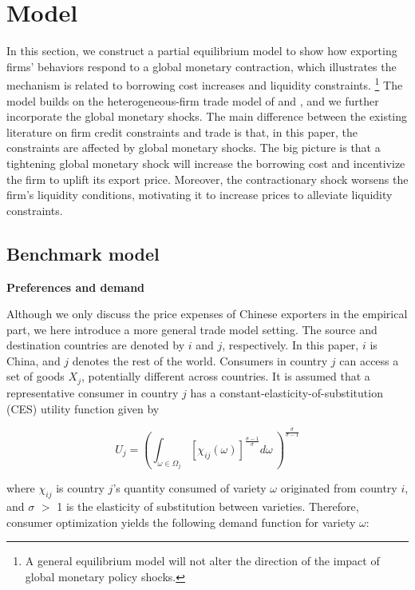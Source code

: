 \newpage
\section{Model}

In this section, we construct a partial equilibrium model to show how exporting firms' behaviors respond to a global monetary contraction, which illustrates the mechanism is related to borrowing cost increases and liquidity constraints.  \footnote{A general equilibrium model will not alter the direction of the impact of global monetary policy shocks.} The model builds on the heterogeneous-firm trade model of \cite{melitz2003impact} and \cite{manova2013credit}, and we further incorporate the global monetary shocks. The main difference between the existing literature on firm credit constraints and trade is that, in this paper, the constraints are affected by global monetary shocks. The big picture is that a tightening global monetary shock will increase the borrowing cost and incentivize the firm to uplift its export price. Moreover, the contractionary shock worsens the firm's liquidity conditions, motivating it to increase prices to alleviate liquidity constraints.

\subsection{Benchmark model}

\textbf{Preferences and demand}

Although we only discuss the price expenses of Chinese exporters in the empirical part, we here introduce a more general trade model setting. The source and destination countries are denoted by $i$ and $j$, respectively. In this paper, $i$ is China, and $j$ denotes the rest of the world. Consumers in country $j$ can access a set of goods $X_j$, potentially different across countries. It is assumed that a representative consumer in country $j$ has a constant-elasticity-of-substitution (CES) utility function given by

\begin{equation}
U_j=(\int_{\omega \in \Omega_j} [\chi_{ij}(\omega)]^{\frac{\sigma-1}{\sigma}} d\omega\ )^\frac{\sigma}{\sigma-1}
\end{equation}

where $\chi_{ij}$ is country $j$’s quantity consumed of variety $\omega$ originated from country $i$, and $\sigma$ $>$ 1 is the elasticity of substitution between varieties. Therefore, consumer optimization yields the following demand function for variety $\omega$:

